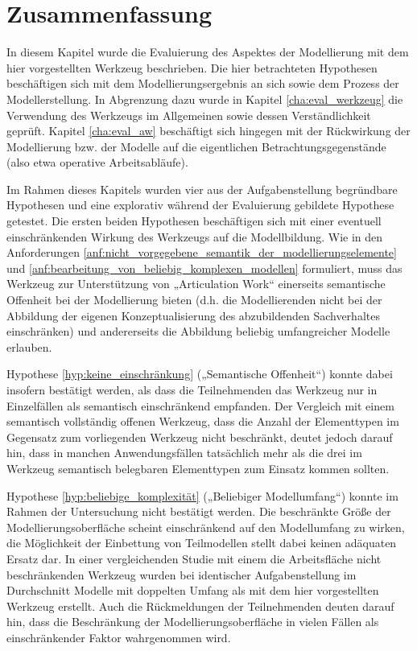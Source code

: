 
\section{Zusammenfassung} %
\label{sec:m_zusammenfassung}

In diesem Kapitel wurde die Evaluierung des Aspektes der Modellierung mit dem hier vorgestellten Werkzeug beschrieben. Die hier betrachteten Hypothesen beschäftigen sich mit dem Modellierungsergebnis an sich sowie dem Prozess der Modellerstellung. In Abgrenzung dazu wurde in Kapitel \ref{cha:eval_werkzeug} die Verwendung des Werkzeugs im Allgemeinen sowie dessen Verständlichkeit geprüft. Kapitel \ref{cha:eval_aw} beschäftigt sich hingegen mit der Rückwirkung der Modellierung bzw. der Modelle auf die eigentlichen Betrachtungsgegenstände (also etwa operative Arbeitsabläufe).

Im Rahmen dieses Kapitels wurden vier aus der Aufgabenstellung begründbare Hypothesen und eine explorativ während der Evaluierung gebildete Hypothese getestet. Die ersten beiden Hypothesen beschäftigen sich mit einer eventuell einschränkenden Wirkung des Werkzeugs auf die Modellbildung. Wie in den Anforderungen \ref{anf:nicht_vorgegebene_semantik_der_modellierungselemente} und \ref{anf:bearbeitung_von_beliebig_komplexen_modellen} formuliert, muss das Werkzeug zur Unterstützung von „Articulation Work“ einerseits semantische Offenheit bei der Modellierung bieten (d.h. die Modellierenden nicht bei der Abbildung der eigenen Konzeptualisierung des abzubildenden Sachverhaltes einschränken) und andererseits die Abbildung beliebig umfangreicher Modelle erlauben. 

Hypothese \ref{hyp:keine_einschränkung} („Semantische Offenheit“) konnte dabei insofern bestätigt werden, als dass die Teilnehmenden das Werkzeug nur in Einzelfällen als semantisch einschränkend empfanden. Der Vergleich mit einem semantisch vollständig offenen Werkzeug, dass die Anzahl der Elementtypen im Gegensatz zum vorliegenden Werkzeug nicht beschränkt, deutet jedoch darauf hin, dass in manchen Anwendungsfällen tatsächlich mehr als die drei im Werkzeug semantisch belegbaren Elementtypen zum Einsatz kommen sollten.  

Hypothese \ref{hyp:beliebige_komplexität} („Beliebiger Modellumfang“) konnte im Rahmen der Untersuchung nicht bestätigt werden. Die beschränkte Größe der Modellierungsoberfläche scheint einschränkend auf den Modellumfang zu wirken, die Möglichkeit der Einbettung von Teilmodellen stellt dabei keinen adäquaten Ersatz dar. In einer vergleichenden Studie mit einem die Arbeitsfläche nicht beschränkenden Werkzeug wurden bei identischer Aufgabenstellung im Durchschnitt Modelle mit doppelten Umfang als mit dem hier vorgestellten Werkzeug erstellt. Auch die Rückmeldungen der Teilnehmenden deuten darauf hin, dass die Beschränkung der Modellierungsoberfläche in vielen Fällen als einschränkender Faktor wahrgenommen wird.

